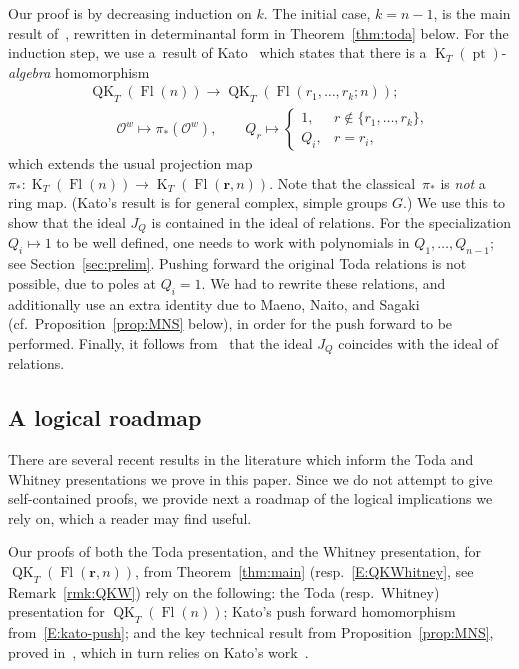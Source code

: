 \documentclass[11pt]{article}
\numberwithin{equation}{section}
\numberwithin{equation}{section}
\theoremstyle{definition}
\DeclareMathOperator{\Fl}{Fl}
\DeclareMathOperator{\QK}{QK}
\DeclareMathOperator{\K}{K}
\DeclareMathOperator{\pt}{pt}
\newcommand{\bfr}{{\mathbf r}}
\newcommand{\cO}{{\mathcal O}}
\begin{document}
Our proof is by decreasing induction on $k$. The initial case, $k=n-1$, is the main result of~\cite{maeno.naito.sagaki:QKideal}, rewritten in determinantal form in Theorem~\ref{thm:toda} below. For the induction step, we use a~result of Kato~\cite{kato2019quantum} which states that there is a
$\K_T(\pt)$-{\em algebra} homomorphism
\begin{gather}
\QK_T(\Fl(n)) \to \QK_T(\Fl(r_1, \dots , r_k;n)); \nonumber\\
\qquad{}\cO^w \mapsto \pi_*(\cO^w) ,
\qquad Q_r \mapsto \begin{cases} 1, & r \notin \{ r_1, \dots, r_k \}, \\
Q_i, & r=r_i ,\end{cases}\label{E:kato-push}
\end{gather}
which extends the usual projection map $\pi_*\colon \K_T(\Fl(n)) \to \K_T(\Fl(\bfr,n))$.
Note that the classical~$\pi_*$ is {\em not} a ring map. (Kato's result is for general complex, simple groups $G$.) We use this to show that the ideal $J_Q$ is contained in the ideal of relations.
For the specialization ${Q_i \mapsto 1}$ to be well defined, one needs to work with
polynomials in $Q_1, \dots, Q_{n-1}$; see Section~\ref{sec:prelim}.
Pushing forward the original Toda relations is not possible, due to poles at $Q_i=1$.
We had to rewrite these relations, and additionally
use an extra identity due to Maeno, Naito, and Sagaki
(cf.~Proposition~\ref{prop:MNS} below), in order for the push forward to be performed.
Finally, it follows from~\cite{GMSXZZ:Nakayama} that the ideal $J_Q$ coincides with the ideal of relations.


\subsection{A logical roadmap} There are several recent results in the literature which inform the Toda and Whitney
presentations we prove in this paper.
Since we do not attempt to give self-contained
proofs, we provide next a roadmap of the logical
implications we rely on, which a reader may find useful.

Our proofs of both the Toda presentation, and the Whitney presentation,
for $\QK_T(\Fl(\bfr,n))$, from Theorem~\ref{thm:main} (resp.\ \eqref{E:QKWhitney}, see Remark~\ref{rmk:QKW})
rely on the following: the Toda (resp.\ Whitney) presentation for $\QK_T(\Fl(n))$;
Kato's push forward homomorphism from~\eqref{E:kato-push}; and the key
technical result from Proposition~\ref{prop:MNS}, proved in~\cite{maeno.naito.sagaki:QKideal},
which in turn relies on Kato's work~\cite{kato:loop}.
\end{document}
